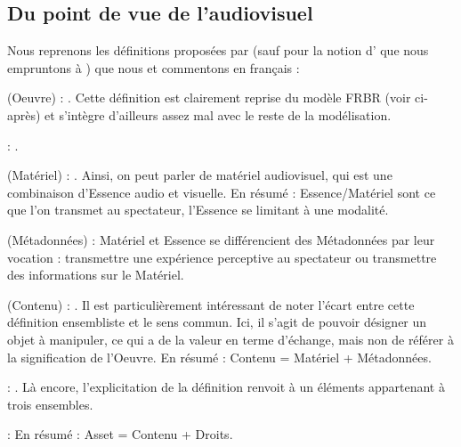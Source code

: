 \subsection{Du point de vue de l'audiovisuel}
Nous reprenons les définitions proposées par \cite[p.77]{Cox2006} (sauf pour la notion d' que nous empruntons à \cite{Austerberry2004}) que nous  et commentons en français : 
\begin{liste}
	\item {} (Oeuvre) : .
	Cette définition est clairement reprise du modèle FRBR (voir ci-après) et s'intègre d'ailleurs assez mal avec le reste de la modélisation.

	\item {} : .

	\item {} (Matériel) : . 
	Ainsi, on peut parler de matériel audiovisuel, qui est une combinaison d'Essence audio et visuelle.
	En résumé : Essence/Matériel sont ce que l'on transmet au spectateur, l'Essence se limitant à une modalité.

	\item {} (Métadonnées) : 
	Matériel et Essence se différencient des Métadonnées par leur vocation : transmettre une expérience perceptive au spectateur ou transmettre des informations sur le Matériel.

	\item {} (Contenu) : . 
	Il est particulièrement intéressant de noter l'écart entre cette définition ensembliste et le sens commun. 
	Ici, il s'agit de pouvoir désigner un objet à manipuler, ce qui a de la valeur en terme d'échange, mais non de référer à la signification de l'Oeuvre.
	En résumé : Contenu = Matériel + Métadonnées.

	\item {} : .
	Là encore, l'explicitation de la définition renvoit à un éléments appartenant à trois ensembles. 

	\item {} :  
	En résumé : Asset = Contenu + Droits.
\end{liste}

